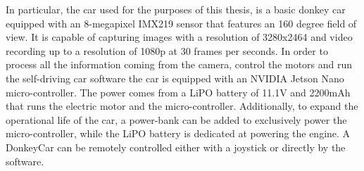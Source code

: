 In particular, the car used for the purposes of this thesis, is a basic donkey car equipped with an 8-megapixel IMX219 sensor that features an 160 degree field of view. It is capable of capturing images with a resolution of 3280x2464 and video recording up to a resolution of 1080p at 30 frames per seconds. In order to process all the information coming from the camera, control the motors and run the self-driving car software the car is equipped with an NVIDIA Jetson Nano micro-controller. The power comes from a LiPO battery of 11.1V and 2200mAh that runs the electric motor and the micro-controller. Additionally, to expand the operational life of the car, a power-bank can be added to exclusively power the micro-controller, while the LiPO battery is dedicated at powering the engine. 
A DonkeyCar can be remotely controlled either with a joystick or directly by the software.